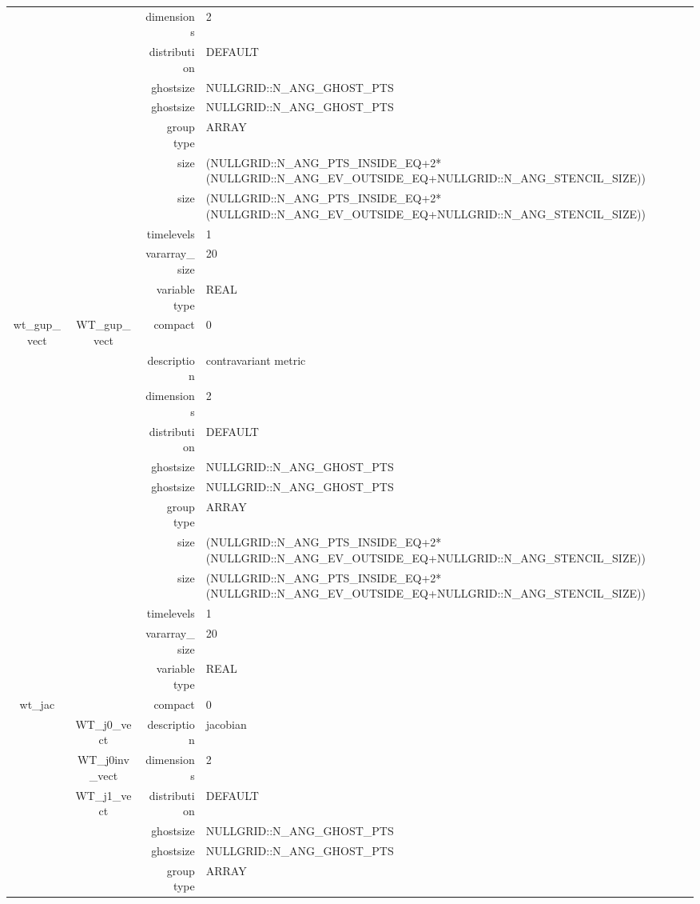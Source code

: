 \begin{tabular*}{150mm}{|c|c@{\extracolsep{\fill}}|rl|}
 &  & dimensions & 2 \\ 
 &  & distribution & DEFAULT \\ 
 &  & ghostsize & NULLGRID::N\_ANG\_GHOST\_PTS \\ 
& ~ & ghostsize & NULLGRID::N\_ANG\_GHOST\_PTS \\ 
 &  & group type & ARRAY \\ 
 &  & size & (NULLGRID::N\_ANG\_PTS\_INSIDE\_EQ+2*(NULLGRID::N\_ANG\_EV\_OUTSIDE\_EQ+NULLGRID::N\_ANG\_STENCIL\_SIZE)) \\ 
& ~ & size & (NULLGRID::N\_ANG\_PTS\_INSIDE\_EQ+2*(NULLGRID::N\_ANG\_EV\_OUTSIDE\_EQ+NULLGRID::N\_ANG\_STENCIL\_SIZE)) \\ 
 &  & timelevels & 1 \\ 
 &  & vararray\_size & 20 \\ 
 &  & variable type & REAL \\ 
\hline 
wt\_gup\_vect & WT\_gup\_vect & compact & 0 \\ 
 &  & description & contravariant metric \\ 
 &  & dimensions & 2 \\ 
 &  & distribution & DEFAULT \\ 
 &  & ghostsize & NULLGRID::N\_ANG\_GHOST\_PTS \\ 
& ~ & ghostsize & NULLGRID::N\_ANG\_GHOST\_PTS \\ 
 &  & group type & ARRAY \\ 
 &  & size & (NULLGRID::N\_ANG\_PTS\_INSIDE\_EQ+2*(NULLGRID::N\_ANG\_EV\_OUTSIDE\_EQ+NULLGRID::N\_ANG\_STENCIL\_SIZE)) \\ 
& ~ & size & (NULLGRID::N\_ANG\_PTS\_INSIDE\_EQ+2*(NULLGRID::N\_ANG\_EV\_OUTSIDE\_EQ+NULLGRID::N\_ANG\_STENCIL\_SIZE)) \\ 
 &  & timelevels & 1 \\ 
 &  & vararray\_size & 20 \\ 
 &  & variable type & REAL \\ 
\hline 
wt\_jac &  & compact & 0 \\ 
 & WT\_j0\_vect & description & jacobian \\ 
 & WT\_j0inv\_vect & dimensions & 2 \\ 
 & WT\_j1\_vect & distribution & DEFAULT \\ 
 &  & ghostsize & NULLGRID::N\_ANG\_GHOST\_PTS \\ 
& ~ & ghostsize & NULLGRID::N\_ANG\_GHOST\_PTS \\ 
 &  & group type & ARRAY \\ 

\end{tabular*}
